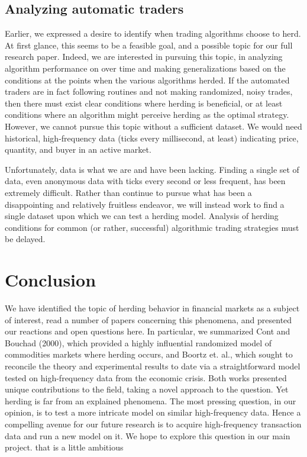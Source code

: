 \documentclass{article}
\begin{document}
\subsection{Analyzing automatic traders}
Earlier, we expressed a desire to identify when trading algorithms choose to herd.
At first glance, this seems to be a feasible goal, and a possible topic for our full research paper. 
Indeed, we are interested in pursuing this topic, in analyzing algorithm performance on over time and making generalizations based on the conditions at the points when the various algorithms herded. 
If the automated traders are in fact following routines and not making randomized, noisy trades, then there must exist clear conditions where herding is beneficial, or at least conditions where an algorithm might perceive herding as the optimal strategy.
However, we cannot pursue this topic without a sufficient dataset.
We would need historical, high-frequency data (ticks every millisecond, at least) indicating price, quantity, and buyer in an active market. 

Unfortunately, data is what we are and have been lacking. 
Finding a single set of data, even anonymous data with ticks every second or less frequent, has been extremely difficult. 
Rather than continue to pursue what has been a disappointing and relatively fruitless endeavor, we will instead work to find a single dataset upon which we can test a herding model. 
Analysis of herding conditions for common (or rather, successful) algorithmic trading strategies must be delayed.

\section{Conclusion}
We have identified the topic of herding behavior in financial markets as a subject of interest, read a number of papers concerning this phenomena, and presented our reactions and open questions here.
In particular, we summarized Cont and Bouchad (2000), which provided a highly influential randomized model of commodities markets where herding occurs, and Boortz et. al., which sought to reconcile the theory and experimental results to date via a straightforward model tested on high-frequency data from the economic crisis.
Both works presented unique contributions to the field, taking a novel approach to the question. 
Yet herding is far from an explained phenomena.
The most pressing question, in our opinion, is to test a more intricate model on similar high-frequency data.
Hence a compelling avenue for our future research is to acquire high-frequency transaction data and run a new model on it.
We hope to explore this question in our main project.
 that is a little ambitious



\end{document}
